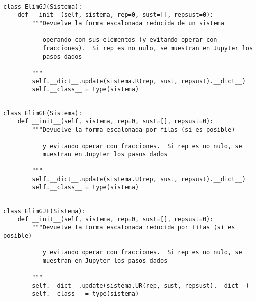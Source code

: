 \documentclass[11pt]{report}
\begin{document}
\begin{verbatim}

class ElimGJ(Sistema):
    def __init__(self, sistema, rep=0, sust=[], repsust=0):
        """Devuelve la forma escalonada reducida de un sistema

           operando con sus elementos (y evitando operar con
           fracciones).  Si rep es no nulo, se muestran en Jupyter los
           pasos dados

        """
        self.__dict__.update(sistema.R(rep, sust, repsust).__dict__)
        self.__class__ = type(sistema)

\end{verbatim}

\begin{verbatim}

class ElimGF(Sistema):
    def __init__(self, sistema, rep=0, sust=[], repsust=0):
        """Devuelve la forma escalonada por filas (si es posible)

           y evitando operar con fracciones.  Si rep es no nulo, se
           muestran en Jupyter los pasos dados

        """        
        self.__dict__.update(sistema.U(rep, sust, repsust).__dict__)
        self.__class__ = type(sistema)

\end{verbatim}

\begin{verbatim}

class ElimGJF(Sistema):
    def __init__(self, sistema, rep=0, sust=[], repsust=0):
        """Devuelve la forma escalonada reducida por filas (si es posible)

           y evitando operar con fracciones.  Si rep es no nulo, se
           muestran en Jupyter los pasos dados

        """        
        self.__dict__.update(sistema.UR(rep, sust, repsust).__dict__)
        self.__class__ = type(sistema)

\end{verbatim}
\end{document}
